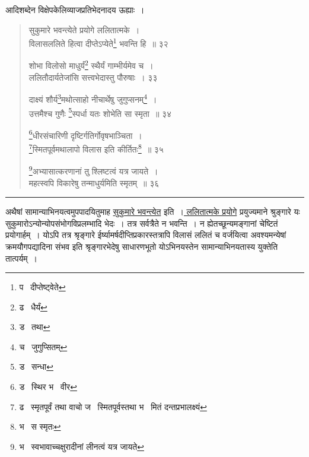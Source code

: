 \documentclass[11pt, openany]{book}
\begin{document}
आदिशब्देन विक्षेपकेलिव्याजप्रतिभेदनादय ऊह्याः~। 

\newpage

\begin{quote}
 {\na सुकुमारे भवन्त्येते प्रयोगे ललितात्मके~। \\
विलासललिते हित्वा दीप्तेऽप्येते\renewcommand{\thefootnote}{1}\footnote{प \textendash\ दीप्तेष्ट्वेते} भवन्ति हि~॥ ३२ 

शोभा विलोसो माधुर्यं\renewcommand{\thefootnote}{2}\footnote{ढ \textendash\ धैर्यं} स्थैर्यं गाम्भीर्यमेव च~।\\ 
ललितौदार्यतेजांसि सत्त्वभेदास्तु पौरुषाः~। ३३ 

दाक्ष्यं शौर्य\renewcommand{\thefootnote}{3}\footnote{ड \textendash\ तथा }मथोत्साहो नीचार्थेषु जुगुप्सनम्\renewcommand{\thefootnote}{4}\footnote{च \textendash\ जुगुप्सितम्}~। \\
उत्तमैश्च गुणैः \renewcommand{\thefootnote}{5}\footnote{ड \textendash\ सन्धा}स्पर्धा यतः शोभेति सा स्मृता~॥ ३४ 

\renewcommand{\thefootnote}{6}\footnote{ड \textendash\ स्थिर भ \textendash\ वीर}धीरसंचारिणी दृष्टिर्गतिर्गोवृषभाञ्चिता~।\\ 
\renewcommand{\thefootnote}{7}\footnote{ढ \textendash\ स्मृतपूर्वं तथा वाचो ज \textendash\ स्मितपूर्वस्तथा भ \textendash\ मितं दन्तप्रभालक्ष्यं}स्मितपूर्वमथालापो विलास इति कीर्तितः\renewcommand{\thefootnote}{8}\footnote{भ \textendash\ स स्मृतः}~॥ ३५ 

\renewcommand{\thefootnote}{9}\footnote{भ \textendash\ स्वभावाच्चक्षुरादीनां लीनत्वं यत्र जायते }अभ्यासात्करणानां तु श्लिष्टत्वं यत्र जायते~। \\
महत्स्वपि विकारेषु तन्माधुर्यमिति स्मृतम्~॥ ३६ }
\end{quote}

\hrule

\vspace{2mm}

\begin{sloppypar}
अथैषां सामान्याभिनयत्वमुपपादयितुमाह \underline{सुकुमारे भवन्त्येत} इति~।\underline{ ललितात्मके प्रयोगे} प्रयुज्यमाने श्रुङ्गारे यः सुकुमारोऽन्योन्योपसंभोगविप्रलम्भादि भेदः~। तत्र सर्वत्रैते न भवन्ति~। न ह्येतच्छून्यमङ्गानां चेष्टितं प्रयोगार्हम्~। योऽपि तत्र श्रृङ्गारे ईर्ष्यामर्षदीप्तिप्रकारस्तत्रापि विलासं ललितं च वर्जयित्वा अवश्यमन्येषां क्रमयौगपद्यादिना संभव इति श्रृङ्गारभेदेषु साधारणभूतो योऽभिनयस्तेन सामान्याभिनयतास्य युक्तेति तात्पर्यम्~।\\ 
\end{sloppypar}
\end{document}
